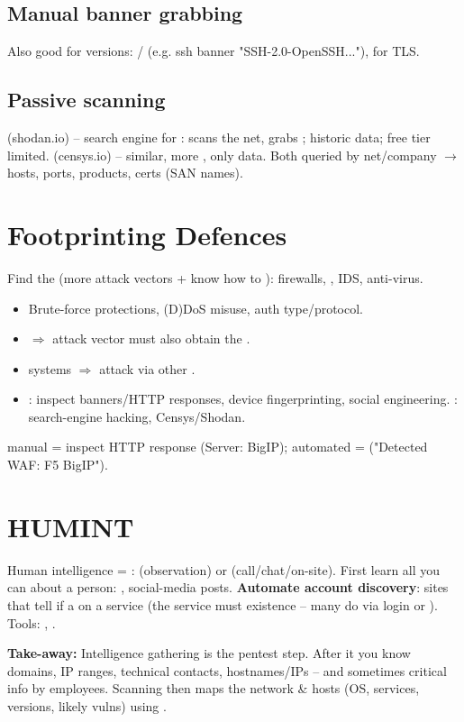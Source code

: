 \subsection{Manual banner grabbing}
Also good for versions: / (e.g. ssh banner "SSH-2.0-OpenSSH..."),  for TLS. 

\subsection{Passive scanning}
 (shodan.io) -- search engine for : scans the net, grabs ; historic data; free tier limited.  (censys.io) -- similar, more , only  data. Both queried by net/company $\to$ hosts, ports, products, certs (SAN names).

\section{Footprinting Defences}
Find the  (more attack vectors + know how to ): firewalls, , IDS, anti-virus.
\begin{itemize}
\item Brute-force protections, (D)DoS misuse, auth type/protocol.
\item {} $\Rightarrow$ attack vector must also obtain the .
\item {} systems $\Rightarrow$ attack via other .
\item {}: inspect banners/HTTP responses, device fingerprinting, social engineering. : search-engine hacking, Censys/Shodan.
\end{itemize}
 manual = inspect HTTP response (Server: BigIP); automated =  ("Detected WAF: F5 BigIP").

\section{HUMINT}
Human intelligence = :  (observation) or  (call/chat/on-site). First learn all you can about a person: , social-media posts.
\textbf{Automate account discovery}: sites that tell if a  on a service (the service must  existence -- many do via login or ). Tools: , .

\begin{defbox}
\textbf{Take-away:} Intelligence gathering is the  pentest step. After it you know domains, IP ranges, technical contacts, hostnames/IPs -- and sometimes critical info  by employees. Scanning then maps the network \& hosts (OS, services, versions, likely vulns) using .
\end{defbox}

